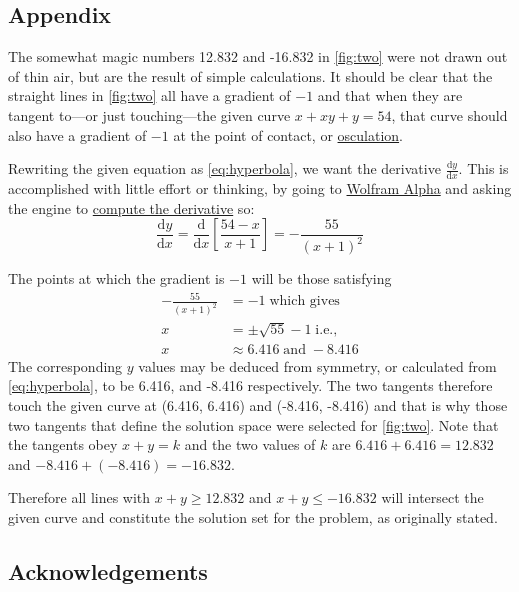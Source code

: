 \documentclass[
  a4paper,
]{article}
\begin{document}
\hypertarget{appendix}{%
\subsection{Appendix}\label{appendix}}

The somewhat magic numbers 12.832 and -16.832 in \cref{fig:two} were not
drawn out of thin air, but are the result of simple calculations. It
should be clear that the straight lines in \cref{fig:two} all have a
gradient of \(-1\) and that when they are tangent to---or just
touching---the given curve \(x + xy + y = 54\), that curve should also
have a gradient of \(-1\) at the point of contact, or
\href{https://en.wikipedia.org/wiki/Osculating_curve}{osculation}.

Rewriting the given equation as \cref{eq:hyperbola}, we want the
derivative \(\frac{\mathrm{d}y}{\mathrm{d}x}\). This is accomplished
with little effort or thinking, by going to
\href{https://www.wolframalpha.com}{Wolfram Alpha} and asking the engine
to
\href{https://www.wolframalpha.com/calculators/derivative-calculator/}{compute
the derivative} so: \[
\frac{\mathrm{d}y}{\mathrm{d}x} = \frac{\mathrm{d}}{\mathrm{d}x}\left[\frac{54 - x}{x + 1}\right] = -\frac{55}{(x + 1)^2}
\]

The points at which the gradient is \(-1\) will be those satisfying \[
\begin{aligned}
-\frac{55}{(x+1)^2} &= -1 \; \mbox{which gives}\\
x &= \pm\sqrt{55} - 1 \; \mbox{i.e.,}\\
x &\approx 6.416 \;\mbox{and}\; -8.416
\end{aligned}
\] The corresponding \(y\) values may be deduced from symmetry, or
calculated from \cref{eq:hyperbola}, to be 6.416, and -8.416
respectively. The two tangents therefore touch the given curve at
(6.416, 6.416) and (-8.416, -8.416) and that is why those two tangents
that define the solution space were selected for \cref{fig:two}. Note
that the tangents obey \(x + y = k\) and the two values of \(k\) are
\(6.416 + 6.416 = 12.832\) and \(-8.416 + (-8.416) = -16.832\).

Therefore all lines with \(x + y \geq 12.832\) and
\(x + y \leq -16.832\) will intersect the given curve and constitute the
solution set for the problem, as originally stated.

\hypertarget{acknowledgements}{%
\subsection{Acknowledgements}\label{acknowledgements}}
\end{document}
